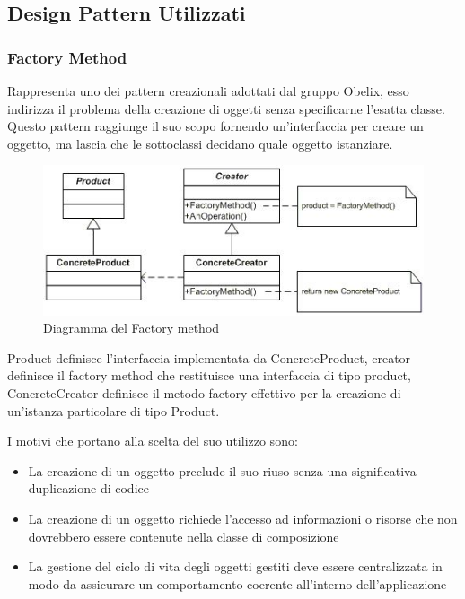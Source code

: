 \subsection{Design Pattern Utilizzati}

\subsubsection{Factory Method}
Rappresenta uno dei pattern creazionali adottati dal gruppo Obelix,
esso  indirizza il problema della creazione di oggetti senza
specificarne l'esatta classe. Questo pattern raggiunge il suo scopo
fornendo un'interfaccia per creare un oggetto, ma lascia che le
sottoclassi decidano quale oggetto istanziare. 

	\FloatBarrier
	\begin{figure}[ht]
		\centering
		\includegraphics[scale=0.45]{img/method.jpg}
		\caption{Diagramma del Factory method}
	\end{figure}


Product definisce l'interfaccia implementata da ConcreteProduct,
creator definisce il factory method che restituisce una interfaccia di
tipo product, ConcreteCreator definisce il metodo factory effettivo
per la creazione di un’istanza particolare di tipo Product. 


I motivi che portano alla scelta del suo utilizzo sono:

\begin{itemize}
\item La creazione di un oggetto preclude il suo riuso senza una significativa duplicazione di codice
\item  La creazione di un oggetto richiede l'accesso ad informazioni o risorse che non dovrebbero essere contenute nella classe di composizione
\item La gestione del ciclo di vita degli oggetti gestiti deve essere centralizzata in modo da assicurare un comportamento coerente all'interno dell'applicazione

\end{itemize}

























